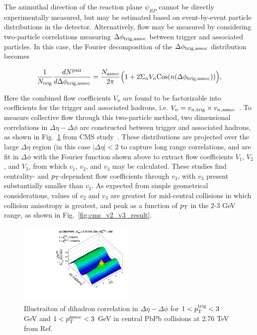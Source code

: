 The azimuthal direction of the reaction plane $\psi_{RP}$ cannot be directly experimentally measured, but may be estimated based on event-by-event particle distributions in the detector.  Alternatively, flow may be measured by considering two-particle correlations measuring $\Delta\phi_{\rm trig, assoc}$ between trigger and associated particles.   In this case, the Fourier decomposition of the $\Delta\phi_{\rm trig, assoc}$ distribution becomes


\begin{equation}
\label{eq:collective_flow_dihad}
\frac{1}{N_{\rm trig}} \frac{dN^{\rm pair}}{d\Delta\phi_{\rm trig, assoc}} = \frac{N_{\rm assoc}}{2\pi} \Big(1+2\Sigma_{n} V_{n} {\rm Cos}(n(\Delta\phi_{\rm trig, assoc}))\Big),
\end{equation}

\noindent Here the combined flow coefficients $V_{n}$ are found to be factorizable into coefficients for the trigger and associated hadrons, i.e. $V_{n} = v_{n, {\rm trig}} \times v_{n, {\rm assoc}}$~\cite{Chatrchyan:2011eka, Chatrchyan:2013nka}.  To measure collective flow through this two-particle method, two dimensional correlations in $\Delta\eta-\Delta\phi$ are constructed between trigger and associated hadrons, as shown in Fig.~\ref{fig:cms_dihadron_2D} from CMS study~\cite{Chatrchyan:2013nka}.  These distributions are projected over the large $\Delta\eta$ region (in this case $|\Delta\eta| < 2$ to capture long range correlations, and are fit in $\Delta\phi$ with the Fourier function shown above to extract flow coefficients $V_{1}$, $V_{2}$, and $V_{3}$, from which $v_{1}$, $v_{2}$, and $v_{3}$ may be calculated.  These studies find centrality- and $p_{\rm T}$-dependent flow coefficients through $v_{3}$, with $v_{3}$ present substantially smaller than $v_{2}$.  As expected from simple geometrical considerations, values of $v_{2}$ and $v_{3}$ are greatest for mid-central collisions in which collision anisotropy is greatest, and peak as a function of $p_{\rm T}$ in the 2-3 GeV range, as shown in Fig.~\ref{fig:cms_v2_v3_result}.  

\begin{figure}[hbtp]
\begin{center}
\includegraphics[width=0.5\textwidth]{figures/Theory/CMS_2particle_corr_2D.pdf}
\caption[Dihadron correlation in $\Delta\eta-\Delta\phi$]{Illustraiton of dihadron correlation in $\Delta\eta-\Delta\phi$ for $1< p_{\rm T}^{\rm trig} < 3$ GeV and $1< p_{\rm T}^{\rm assoc} < 3$ GeV in central PbPb collisions at 2.76 TeV from Ref.~\cite{Chatrchyan:2013nka}}
\label{fig:cms_dihadron_2D}
\end{center}
\end{figure}

